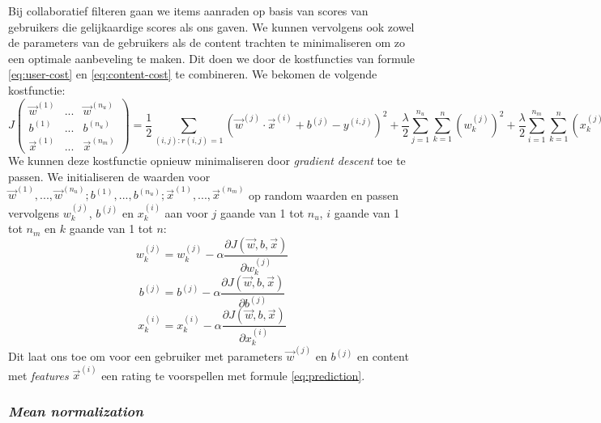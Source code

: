 Bij collaboratief filteren gaan we items aanraden op basis van scores van gebruikers die gelijkaardige scores als ons gaven. We kunnen vervolgens ook  zowel de parameters van de gebruikers als de content trachten te minimaliseren om zo een optimale aanbeveling te maken. Dit doen we door de kostfuncties van formule \ref{eq:user-cost} en  \ref{eq:content-cost} te combineren. We bekomen de volgende kostfunctie:
\begin{equation}
	J \begin{pmatrix} \vec{w}^{(1)} & ... & \vec{w}^{(n_{u})} \\ b^{(1)} & ... & b^{(n_{u})} \\ \vec{x}^{(1)} & ... & \vec{x}^{(n_{m})} \end{pmatrix} 
	= \frac{1}{2} \sum_{(i, j):r(i, j) = 1} (\vec{w}^{(j)} \cdot \vec{x}^{(i)} + b^{(j)} - y^{(i, j)})^{2} 
	+ \frac{\lambda}{2} \sum_{j=1}^{n_{u}} \sum_{k=1}^{n}(w_{k}^{(j)})^{2}
	+ \frac{\lambda}{2} \sum_{i=1}^{n_{m}} \sum_{k=1}^{n}(x_{k}^{(j)})^{2}
\end{equation}
\noindent
We kunnen deze kostfunctie opnieuw minimaliseren door \textit{gradient descent} toe te passen. We initialiseren de waarden voor $\vec{w}^{(1)}, ..., \vec{w}^{(n_{u})}; b^{(1)}, ..., b^{(n_{u})}; \vec{x}^{(1)}, ..., \vec{x}^{(n_{m})}$ op random waarden en passen vervolgens $w_{k}^{(j)}$, $b^{(j)}$ en $x_{k}^{(i)}$ aan voor $j$ gaande van 1 tot $n_{u}$, $i$ gaande van 1 tot $n_{m}$ en $k$ gaande van 1 tot $n$:
\begin{equation}
	w_{k}^{(j)} = w_{k}^{(j)} - \alpha \frac{\partial J(\vec{w}, b, \vec{x})}{\partial w_{k}^{(j)}}
\end{equation}
\begin{equation}
	b^{(j)} = b^{(j)} - \alpha \frac{\partial J(\vec{w}, b, \vec{x})}{\partial b^{(j)}}
\end{equation}
\begin{equation}
	x_{k}^{(i)} = x_{k}^{(i)} - \alpha \frac{\partial J(\vec{w}, b, \vec{x})}{\partial x_{k}^{(i)}}
\end{equation}
\noindent
Dit laat ons toe om voor een gebruiker met parameters $\vec{w}^{(j)}$ en $b^{(j)}$ en content met \textit{features} $\vec{x}^{(i)}$ een rating te voorspellen met formule \ref{eq:prediction}.

\subsubsection{\textit{Mean normalization}}

